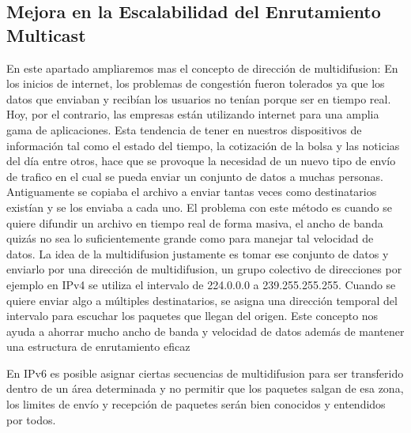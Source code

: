 \documentclass[11pt,a4paper]{article}
\begin{document}
\subsection{Mejora en la Escalabilidad del Enrutamiento Multicast}
En este apartado ampliaremos mas el concepto de dirección de multidifusion: En los inicios de 
internet, los problemas de congestión fueron tolerados ya que los datos que enviaban y recibían los 
usuarios no tenían porque ser en tiempo real. Hoy, por el contrario, las empresas están utilizando 
internet para una amplia gama de aplicaciones. Esta tendencia de tener en nuestros dispositivos de 
información tal como el estado del tiempo, la cotización de la bolsa y las noticias del día entre 
otros, hace que se provoque la necesidad de un nuevo tipo de envío de trafico en el cual se pueda 
enviar un conjunto de datos a muchas personas. Antiguamente se copiaba el archivo a enviar tantas 
veces como destinatarios existían y se los enviaba a cada uno. El problema con este método es cuando 
se quiere difundir un archivo en tiempo real de forma masiva, el ancho de banda quizás no sea lo 
suficientemente grande como para manejar tal velocidad de datos. La idea de la multidifusion 
justamente es tomar ese conjunto de datos y enviarlo por una dirección de multidifusion, un grupo 
colectivo de direcciones por ejemplo en IPv4 se utiliza el intervalo de 224.0.0.0 a 239.255.255.255. 
Cuando se quiere enviar algo a múltiples destinatarios, se asigna una dirección temporal del 
intervalo para escuchar los paquetes que llegan del origen. Este concepto nos ayuda a ahorrar mucho 
ancho de banda y velocidad de datos además de mantener una estructura de enrutamiento eficaz \par
En IPv6 es posible asignar ciertas secuencias de multidifusion para ser transferido dentro de un 
área determinada y no permitir que los paquetes salgan de esa zona, los limites de envío y recepción 
de paquetes serán bien conocidos y entendidos por todos.
\end{document}
